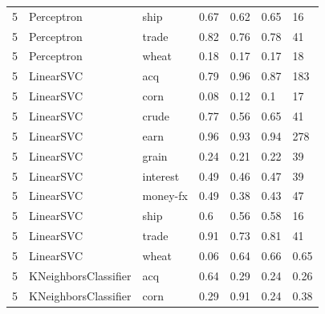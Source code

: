 \documentclass{article}
\begin{document}
\begin{table}[h]
\begin{tabular}{lllllll}
5             & Perceptron             & ship            & 0.67               & 0.62            & 0.65              & 16               \\
5             & Perceptron             & trade           & 0.82               & 0.76            & 0.78              & 41               \\
5             & Perceptron             & wheat           & 0.18               & 0.17            & 0.17              & 18               \\
5             & LinearSVC              & acq             & 0.79               & 0.96            & 0.87              & 183              \\
5             & LinearSVC              & corn            & 0.08               & 0.12            & 0.1               & 17               \\
5             & LinearSVC              & crude           & 0.77               & 0.56            & 0.65              & 41               \\
5             & LinearSVC              & earn            & 0.96               & 0.93            & 0.94              & 278              \\
5             & LinearSVC              & grain           & 0.24               & 0.21            & 0.22              & 39               \\
5             & LinearSVC              & interest        & 0.49               & 0.46            & 0.47              & 39               \\
5             & LinearSVC              & money-fx        & 0.49               & 0.38            & 0.43              & 47               \\
5             & LinearSVC              & ship            & 0.6                & 0.56            & 0.58              & 16               \\
5             & LinearSVC              & trade           & 0.91               & 0.73            & 0.81              & 41               \\
5             & LinearSVC              & wheat           & 0.06               & 0.64            & 0.66              & 0.65             \\
5             & KNeighborsClassifier   & acq             & 0.64               & 0.29            & 0.24              & 0.26             \\
5             & KNeighborsClassifier   & corn            & 0.29               & 0.91            & 0.24              & 0.38             \\

\end{tabular}
\end{table}
\end{document}
